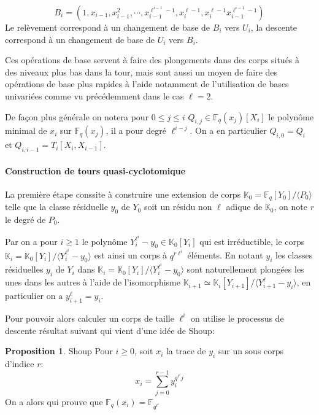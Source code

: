 \documentclass[10pt,a4paper]{book}
\theoremstyle{plain}
\theoremstyle{definition}
\theoremstyle{definition}
\theoremstyle{definition}
\newtheorem{prop}[thm]{Proposition}
\theoremstyle{definition}
\theoremstyle{remark}
\theoremstyle{remark}
\begin{document}
\[
B_i=(1,x_{i-1},x_{i-1}^2,\cdots,x_{i-1}^{\ell^{i-1}-1},x_i^{\ell-1},x_i^{\ell-1}x_{i-1}^{\ell^{i-1}-1})
\] 
Le relèvement correspond à un changement de base de $B_i$ vers $U_i$, la descente correspond à un changement de base de $U_i$ vers $B_i$.

Ces opérations de base servent à faire des plongements dans des corps situés à des niveaux plus bas dans la tour, mais sont aussi un moyen de faire des opérations de base plus rapides à l'aide notamment de l'utilisation de bases univariées comme vu précédemment dans le cas $\ell=2$.

De façon plus générale on notera pour $0 \leqslant j \leqslant i $ $Q_{i,j} \in \mathbb{F}_q(x_j)[X_i]$ le polynôme minimal de $x_i$ sur $\mathbb{F}_{q}(x_j)$, il a pour degré $\ell^{i-j}$. On a en particulier $Q_{i,0}=Q_i$ et $Q_{i,i-1}=T_{i}[X_i,X_{i-1}]$.

\paragraph{Construction de tours quasi-cyclotomique}
La première étape conssite à construire une extension de corps $\mathbb{K}_0=\mathbb{F}_q[Y_0]/\langle P_0 \rangle$ telle que la classe résiduelle $y_0$ de $Y_0$ soit un résidu non $\ell$ adique de $\mathbb{K}_0$, on note $r$ le degré de $P_0$.

Par \cite[Th. VI.9.1]{Lang2002algebra} on a pour $i \geqslant 1$ le polynôme $Y_i^{\ell^i}-y_0 \in \mathbb{K}_0[Y_i]$ qui est irréductible, le corps $\mathbb{K}_i=\mathbb{K}_0[Y_i]/\langle Y_i^{\ell^i}-y_0 \rangle$ est ainsi un corps à $q^{r\ell^i}$ éléments. En notant $y_i$ les classes résiduelles $y_i$ de $Y_i$ dans $\mathbb{K}_i=\mathbb{K}_0[Y_i]/\langle Y_i^{\ell^i}-y_0 \rangle$ sont naturellement plongées les unes dans les autres à l'aide de l'isomorphisme $\mathbb{K}_{i+1} \simeq \mathbb{K}_i[Y_{i+1}]/\langle Y_{i+1}^{\ell}-y_i\rangle $, en particulier on a $y_{i+1}^{\ell}=y_i$.


 Pour pouvoir alors calculer un corps de taille $\ell^i$ on utilise le processus de descente résultat suivant qui vient d'une idée de Shoup:

\begin{prop}{Shoup}
Pour $i \geqslant 0$, soit $x_i$ la trace de $y_i$ sur un sous corps d'indice $r$:
\begin{equation*}
x_i=\sum_{j=0}^{r-1}y_i^{q^{\ell^i}j}
\end{equation*}
On a alors \cite[Th. 2.1]{Shoup88} qui prouve que $\mathbb{F}_q(x_i)=\mathbb{F}_{q^{\ell^i}}$
\end{prop}
\end{document}

